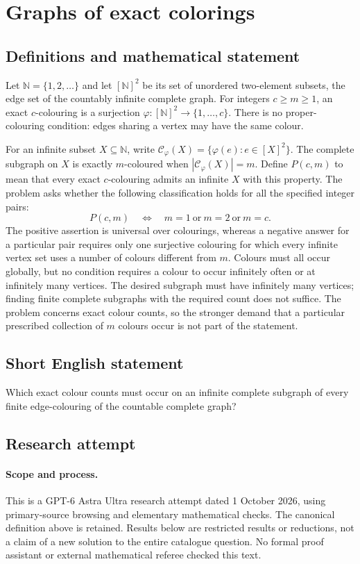 \documentclass[11pt,a4paper]{article}
\begin{document}
\section*{Graphs of exact colorings}\label{statement}

\subsection{Definitions and mathematical statement}
Let $\mathbb N=\{1,2,\ldots\}$ and let $[\mathbb N]^2$ be its set of unordered
two-element subsets, the edge set of the countably infinite complete graph.
For integers $c\ge m\ge1$, an exact $c$-colouring is a surjection
$\varphi:[\mathbb N]^2\to\{1,\ldots,c\}$. There is no proper-colouring
condition: edges sharing a vertex may have the same colour.

For an infinite subset $X\subseteq\mathbb N$, write
$\mathcal C_\varphi(X)=\{\varphi(e):e\in[X]^2\}$.
The complete subgraph on $X$ is exactly $m$-coloured when
$|\mathcal C_\varphi(X)|=m$. Define $P(c,m)$ to mean that every exact
$c$-colouring admits an infinite $X$ with this property.
The problem asks whether the following classification holds for all the
specified integer pairs:
\[
 P(c,m)\quad\Longleftrightarrow\quad
 m=1\ \text{or}\ m=2\ \text{or}\ m=c.
\]
The positive assertion is universal over colourings, whereas a negative
answer for a particular pair requires only one surjective colouring for
which every infinite vertex set uses a number of colours different from $m$.
Colours must all occur globally, but no condition requires a colour to occur
infinitely often or at infinitely many vertices. The desired subgraph must
have infinitely many vertices; finding finite complete subgraphs with the
required count does not suffice. The problem concerns exact colour counts,
so the stronger demand that a particular prescribed collection of $m$
colours occur is not part of the statement.
\subsection{Short English statement}
Which exact colour counts must occur on an infinite complete subgraph of every finite edge-colouring of the countable complete graph?
\subsection{Research attempt}
\paragraph{Scope and process.}
This is a GPT-6 Astra Ultra research attempt dated 1 October 2026, using
primary-source browsing and elementary mathematical checks. The canonical
definition above is retained. Results below are restricted results or
reductions, not a claim of a new solution to the entire catalogue question.
No formal proof assistant or external mathematical referee checked this text.
\end{document}
